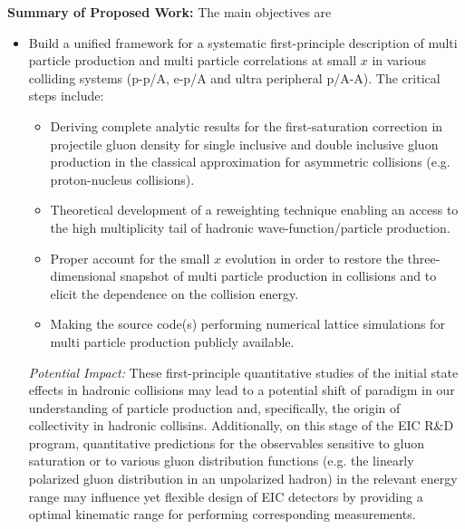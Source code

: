 \vspace{0.5em}
\noindent
{\bf Summary of Proposed Work:}
The main objectives  are 
\begin{itemize}




	\item Build a unified framework for a systematic 
		first-principle description of multi particle production and
		multi particle correlations at small $x$ in 
		various colliding systems (p-p/A, e-p/A and ultra peripheral p/A-A). The critical steps include:
		\begin{itemize}
			\item Deriving complete analytic results for the first-saturation correction 
		in projectile gluon density for single inclusive and double inclusive 
		gluon production in the classical approximation for 
		asymmetric collisions (e.g. proton-nucleus collisions).
			\item Theoretical  development of a reweighting technique
		enabling an access to the high multiplicity tail of 
		hadronic wave-function/particle production. 
			\item Proper account for the small $x$ evolution in order to restore the
		three-dimensional snapshot of multi particle production in collisions
		and to elicit the dependence on the collision energy.
			\item Making the source code(s) performing numerical lattice 
				simulations for multi particle production publicly available. 
		\end{itemize}

		{\it Potential Impact:} 
		These first-principle quantitative studies of the initial state effects in hadronic collisions 
		may lead to a potential shift of paradigm in our understanding of 
		particle production and, specifically,  the origin of collectivity in hadronic collisins. Additionally, 
		on this stage of 
		the EIC R\&D program, quantitative  predictions for the observables sensitive to 
		gluon saturation or to various gluon distribution functions  
		(e.g. the linearly polarized gluon distribution in an unpolarized hadron)  
		in the relevant energy range 
		may influence yet flexible design of EIC detectors by providing a
		optimal kinematic range for performing corresponding measurements.  


\end{itemize}
